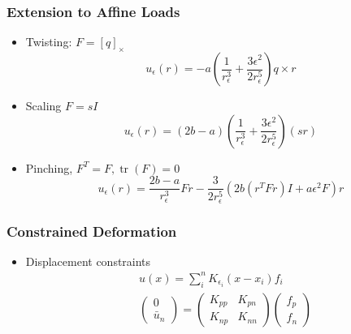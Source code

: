 \documentclass[serif,mathserif, 12pt]{beamer}
\DeclareMathOperator{\tr}{tr}
\begin{document}
\begin{frame}
  \frametitle{Extension to Affine Loads}
  \begin{itemize}
  \item Twisting: $F = [q]_\times$
    \begin{equation*}
      u_\epsilon(r) = -a(\frac{1}{r_\epsilon^3}+\frac{3\epsilon^2}{2r_\epsilon^5})q\times r
    \end{equation*}
  \item Scaling $F = sI$
    \begin{equation*}
      u_\epsilon(r) = (2b-a)(\frac{1}{r_\epsilon^3}+\frac{3\epsilon^2}{2r_\epsilon^5})(sr)
    \end{equation*}
  \item Pinching, $F^T = F, \tr(F) = 0$
    \begin{equation*}
      u_\epsilon(r) = \frac{2b-a}{r_\epsilon^3}Fr - \frac{3}{2r_\epsilon^5}(2b(r^TFr)I +a\epsilon^2 F)r
    \end{equation*}
  \end{itemize}
\end{frame}

\begin{frame}
  \frametitle{Constrained Deformation}
  \begin{itemize}
  \item Displacement constraints
    \begin{equation*}
      \begin{split}
        &u(x) =\sum_i^n K_{\epsilon_i}(x-x_i)f_i \\
        &
        \begin{pmatrix}
          0 \\ \bar u_n
        \end{pmatrix}
        =
        \begin{pmatrix}
          K_{pp}& K_{pn}\\
          K_{np}& K_{nn}
        \end{pmatrix}
        \begin{pmatrix}
          f_p \\ f_n
        \end{pmatrix}
      \end{split}      
    \end{equation*}
  \end{itemize}
\end{frame}
\end{document}
